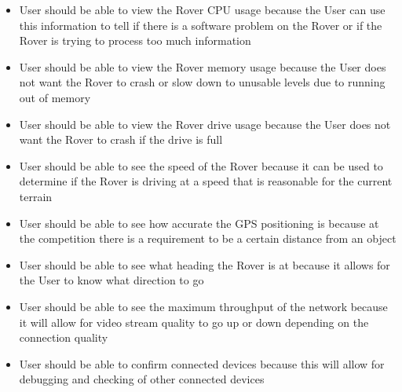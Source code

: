 \documentclass[onecolumn, draftclsnofoot, 10pt, compsoc]{IEEEtran}
\begin{document}
\begin{itemize}
\item User should be able to view the Rover CPU usage because the User can use this information to tell if there is a software problem on the Rover or if the Rover is trying to process too much information
\item User should be able to view the Rover memory usage because the User does not want the Rover to crash or slow down to unusable levels due to running out of memory
\item User should be able to view the Rover drive usage because the User does not want the Rover to crash if the drive is full
\item User should be able to see the speed of the Rover because it can be used to determine if the Rover is driving at a speed that is reasonable for the current terrain
\item User should be able to see how accurate the GPS positioning is because at the competition there is a requirement to be a certain distance from an object
\item User should be able to see what heading the Rover is at because it allows for the User to know what direction to go
\item User should be able to see the maximum throughput of the network because it will allow for video stream quality to go up or down depending on the connection quality
\item User should be able to confirm connected devices because this will allow for debugging and checking of other connected devices
\end{itemize}
\end{document}
